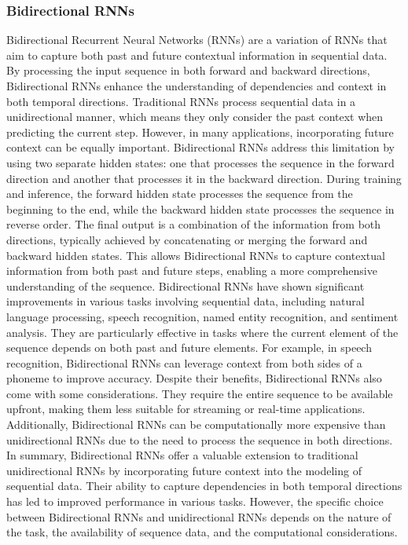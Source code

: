 \subsubsection{Bidirectional RNNs}
Bidirectional Recurrent Neural Networks (RNNs) are a variation of RNNs that aim to capture both past and future contextual information in sequential data. By processing the input sequence in both forward and backward directions, Bidirectional RNNs enhance the understanding of dependencies and context in both temporal directions.
Traditional RNNs process sequential data in a unidirectional manner, which means they only consider the past context when predicting the current step. However, in many applications, incorporating future context can be equally important. Bidirectional RNNs address this limitation by using two separate hidden states: one that processes the sequence in the forward direction and another that processes it in the backward direction.
During training and inference, the forward hidden state processes the sequence from the beginning to the end, while the backward hidden state processes the sequence in reverse order. The final output is a combination of the information from both directions, typically achieved by concatenating or merging the forward and backward hidden states. This allows Bidirectional RNNs to capture contextual information from both past and future steps, enabling a more comprehensive understanding of the sequence.
Bidirectional RNNs have shown significant improvements in various tasks involving sequential data, including natural language processing, speech recognition, named entity recognition, and sentiment analysis. They are particularly effective in tasks where the current element of the sequence depends on both past and future elements. For example, in speech recognition, Bidirectional RNNs can leverage context from both sides of a phoneme to improve accuracy.
Despite their benefits, Bidirectional RNNs also come with some considerations. They require the entire sequence to be available upfront, making them less suitable for streaming or real-time applications. Additionally, Bidirectional RNNs can be computationally more expensive than unidirectional RNNs due to the need to process the sequence in both directions.
In summary, Bidirectional RNNs offer a valuable extension to traditional unidirectional RNNs by incorporating future context into the modeling of sequential data. Their ability to capture dependencies in both temporal directions has led to improved performance in various tasks. However, the specific choice between Bidirectional RNNs and unidirectional RNNs depends on the nature of the task, the availability of sequence data, and the computational considerations.
